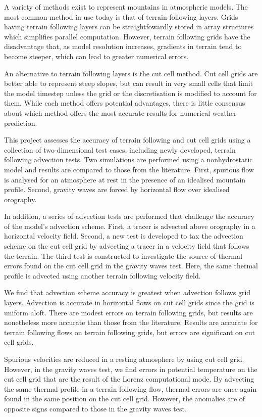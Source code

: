A variety of methods exist to represent mountains in atmospheric models.  The most common method in use today is that of terrain following layers.  Grids having terrain following layers can be straightfowardly stored in array structures which simplifies parallel computation.
However, terrain following grids have the disadvantage that, as model resolution increases, gradients in terrain tend to become steeper, which can lead to greater numerical errors.

An alternative to terrain following layers is the cut cell method.  Cut cell grids are better able to represent steep slopes, but can result in very small cells that limit the model timestep unless the grid or the discretisation is modified to account for them.
While each method offers potential advantages, there is little consensus about which method offers the most accurate results for numerical weather prediction.

This project assesses the accuracy of terrain following and cut cell grids using a collection of two-dimensional test cases, including newly developed, terrain following advection tests.  Two simulations are performed using a nonhydrostatic model and results are compared to those from the literature.  First, spurious flow is analysed for an atmosphere at rest in the presence of an idealised mountain profile.  Second, gravity waves are forced by horizontal flow over idealised orography.

In addition, a series of advection tests are performed that challenge the accuracy of the model's advection scheme.  First, a tracer is advected above orography in a horizontal velocity field.
Second, a new test is developed to tax the advection scheme on the cut cell grid by advecting a tracer in a velocity field that follows the terrain.
The third test is constructed to investigate the source of thermal errors found on the cut cell grid in the gravity waves test.  Here, the same thermal profile is advected using another terrain following velocity field.

We find that advection scheme accuracy is greatest when advection follows grid layers.  Advection is accurate in horizontal flows on cut cell grids since the grid is uniform aloft.  There are modest errors on terrain following grids, but results are nonetheless more accurate than those from the literature.  Results are accurate for terrain following flows on terrain following grids, but errors are significant on cut cell grids.

Spurious velocities are reduced in a resting atmosphere by using cut cell grid.  However, in the gravity waves test, we find errors in potential temperature on the cut cell grid that are the result of the Lorenz computational mode.   By advecting the same thermal profile in a terrain following flow, thermal errors are once again found in the same position on the cut cell grid.  However, the anomalies are of opposite signs compared to those in the gravity waves test.

